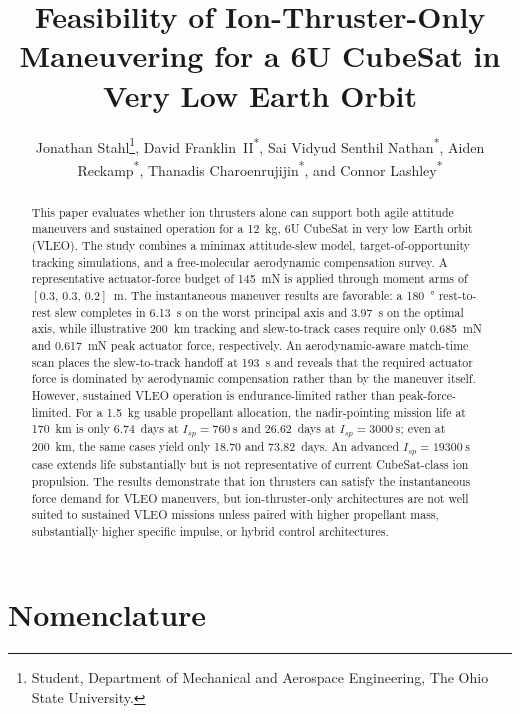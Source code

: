 \documentclass[conf]{new-aiaa}
\title{Feasibility of Ion-Thruster-Only Maneuvering for a 6U CubeSat in Very Low Earth Orbit}
\author{Jonathan Stahl\footnote{Student, Department of Mechanical and Aerospace Engineering, The Ohio State University.},
David Franklin~II\textsuperscript{*},
Sai Vidyud Senthil Nathan\textsuperscript{*},
Aiden Reckamp\textsuperscript{*},
Thanadis Charoenrujijin\textsuperscript{*},
and Connor Lashley\textsuperscript{*}}
\affil{The Ohio State University, Columbus, Ohio 43210}
\begin{document}
\maketitle

\begin{abstract}
This paper evaluates whether ion thrusters alone can support both agile attitude maneuvers and sustained operation for a \SI{12}{\kilogram}, 6U CubeSat in very low Earth orbit (VLEO). The study combines a minimax attitude-slew model, target-of-opportunity tracking simulations, and a free-molecular aerodynamic compensation survey. A representative actuator-force budget of \SI{145}{\milli\newton} is applied through moment arms of $[0.3,\,0.3,\,0.2]$~m. The instantaneous maneuver results are favorable: a \SI{180}{\degree} rest-to-rest slew completes in \SI{6.13}{\second} on the worst principal axis and \SI{3.97}{\second} on the optimal axis, while illustrative \SI{200}{\kilo\meter} tracking and slew-to-track cases require only \SI{0.685}{\milli\newton} and \SI{0.617}{\milli\newton} peak actuator force, respectively. An aerodynamic-aware match-time scan places the slew-to-track handoff at \SI{193}{\second} and reveals that the required actuator force is dominated by aerodynamic compensation rather than by the maneuver itself. However, sustained VLEO operation is endurance-limited rather than peak-force-limited. For a \SI{1.5}{\kilogram} usable propellant allocation, the nadir-pointing mission life at \SI{170}{\kilo\meter} is only 6.74~days at $I_{sp}=\SI{760}{\second}$ and 26.62~days at $I_{sp}=\SI{3000}{\second}$; even at \SI{200}{\kilo\meter}, the same cases yield only 18.70 and 73.82~days. An advanced $I_{sp}=\SI{19300}{\second}$ case extends life substantially but is not representative of current CubeSat-class ion propulsion. The results demonstrate that ion thrusters can satisfy the instantaneous force demand for VLEO maneuvers, but ion-thruster-only architectures are not well suited to sustained VLEO missions unless paired with higher propellant mass, substantially higher specific impulse, or hybrid control architectures.
\end{abstract}

\section{Nomenclature}
\end{document}
